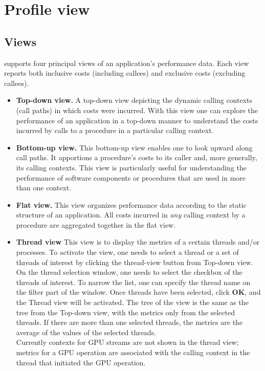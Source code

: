 \documentclass[english]{article}
\begin{document}
\section{Profile view}

\subsection{Views}

 supports four principal views of an application's performance data.
Each view reports both inclusive costs (including callees) and exclusive costs (excluding callees).

\begin{itemize}

\item \textbf{Top-down view.}
A top-down view depicting the dynamic calling contexts (call paths) in which costs were incurred.
With this view one can explore the performance of an application in a top-down manner
to understand the costs incurred by calls to a procedure in a particular calling context.

\item \textbf{Bottom-up view.}
This bottom-up view enables one to look upward along call paths.
It apportions a procedure's costs to its caller and, more generally,
its calling contexts.
This view is particularly useful for understanding the performance of software components or procedures
that are used in more than one context.

\item \textbf{Flat view.}
This view organizes performance data according to the static structure of an application.
All costs incurred in \emph{any} calling context by a procedure are aggregated together in the flat view.

\item \textbf{Thread view}
	This view is to display the metrics of a certain threads and/or processes.
To activate the view, one needs to select a thread or a set of threads of interest by clicking the thread-view button from Top-down view.
On the thread selection window, one needs to select the checkbox of the threads of interest.
To  narrow the list, one can specify the thread name on the filter part of the window.
Once threads have been selected, click \textbf{OK}, and the Thread view will be activated.
The tree of the view is the same as the tree from the Top-down view, with the metrics only from the selected threads.
If there are more than one selected threads, the metrics are the average of the values of the selected threads.
\\
Currently contexts for GPU streams are not shown in the thread view; metrics for a GPU operation are associated with the calling context in the thread that initiated the GPU operation.


\end{itemize}
\end{document}
